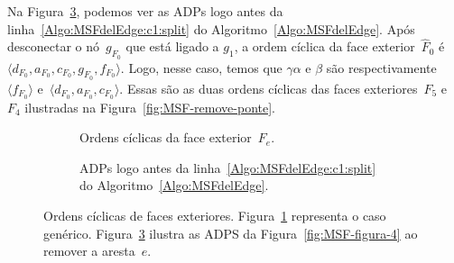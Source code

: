 Na Figura~\ref{fig:MSF-ordem-ciclica-ponte-e}, podemos ver as ADPs logo antes da linha~\ref{Algo:MSFdelEdge:c1:split} do Algoritmo~\ref{Algo:MSFdelEdge}.
Após desconectar o nó~$g_{F_0}$ que está ligado a $g_1$, a ordem cíclica da face exterior~$\hat F_0$ é $\langle d_{F_0}, a_{F_0}, c_{F_0}, g_{F_0}, f_{F_0}\rangle$.
Logo, nesse caso, temos que $\gamma\alpha$ e $\beta$ são respectivamente $\langle f_{F_0} \rangle$ e~$\langle d_{F_0}, a_{F_0}, c_{F_0}\rangle$.
Essas são as duas ordens cíclicas das faces exteriores~$F_5$ e $F_4$ ilustradas na Figura~\ref{fig:MSF-remove-ponte}.

\begin{figure}[htb]
\begin{subfigure}{.4\textwidth}

\caption{Ordens cíclicas da face exterior~$F_e$.}
\label{fig:MSF-ordem-ciclica-ponte}
\end{subfigure}
\hfill
\begin{subfigure}{.4\textwidth}

\caption{ADPs logo antes da linha~\ref{Algo:MSFdelEdge:c1:split} do Algoritmo~\ref{Algo:MSFdelEdge}.}
\label{fig:MSF-ordem-ciclica-ponte-e}
\end{subfigure}
	\caption{Ordens cíclicas de faces exteriores. Figura~\ref{fig:MSF-ordem-ciclica-ponte} representa o caso genérico. Figura~\ref{fig:MSF-ordem-ciclica-ponte-e} ilustra as ADPS da Figura~\ref{fig:MSF-figura-4} ao remover a aresta~$e$.}
\end{figure}



